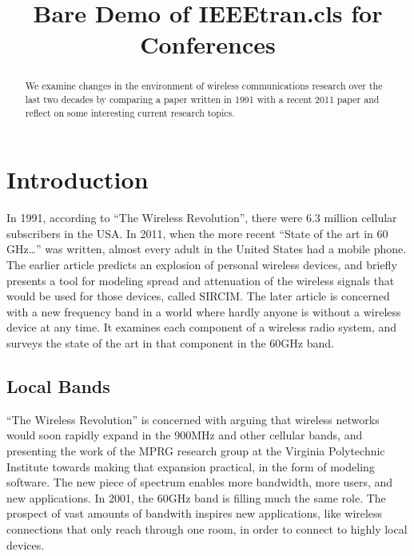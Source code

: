 \documentclass[conference]{IEEEtran}
\begin{document}
%
\title{Bare Demo of IEEEtran.cls for Conferences}


\author{
}

\maketitle


\begin{abstract}
We examine changes in the environment of wireless communications
research over the last two decades by comparing a paper written in 1991 \cite{oldpaper:rapp}
with a recent 2011 paper \cite{bigpaper:rapp} and reflect on some interesting current research topics.
\end{abstract}
\IEEEpeerreviewmaketitle

\section{Introduction}
In 1991, according to ``The Wireless Revolution'', there were 6.3 million
cellular subscribers in the USA.  In 2011, when the more recent
``State of the art in 60 GHz\ldots'' was written, almost every adult in the
United States had a mobile phone.  The earlier article predicts an explosion
of personal wireless devices, and briefly presents a tool for modeling spread and 
attenuation of the wireless signals that would be used for those devices,
called SIRCIM.  The later article is concerned with a new frequency band
in a world where hardly anyone is without a wireless device at any time.
It examines each component of a wireless radio system, and surveys the
state of the art in that component in the 60GHz band.\\

\subsection{Local Bands}
``The Wireless Revolution'' is concerned with arguing that wireless networks
would soon rapidly expand in the 900MHz and other cellular bands, and
presenting the work of the MPRG research group at the Virginia Polytechnic
Institute towards making that expansion practical, in the form of modeling
software.  The new piece of spectrum enables more bandwidth, more users, and 
new applications.  In 2001, the 60GHz band is filling much the same role.  
The prospect of vast amounts of bandwith inspires new applications, like 
wireless connections that only reach through one room, in order to connect
to highly local devices.  
\end{document}
